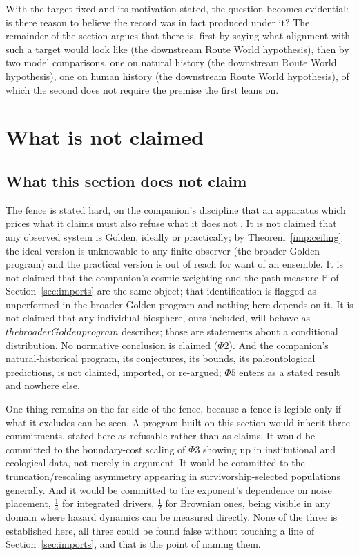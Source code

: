 \documentclass[11pt]{article}
\newcommand{\PP}{\mathbb{P}}
\theoremstyle{plain}
\theoremstyle{definition}
\theoremstyle{remark}
\begin{document}
With the target fixed and its motivation stated, the question becomes
evidential: is there reason to believe the record was in fact produced
under it? The remainder of the section argues that there is, first by
saying what alignment with such a target would look like
(the downstream Route World hypothesis), then by two model comparisons, one on
natural history (the downstream Route World hypothesis), one on human history
(the downstream Route World hypothesis), of which the second does not require
the premise the first leans on.


\section{What is not claimed}\label{sec:fences}

\subsection{What this section does not claim}\label{gr:sub:fence}

The fence is stated hard, on the companion's discipline that an
apparatus which prices what it claims must also refuse what it does not
\cite{Ben26Optimal}. It is not claimed that any observed system is Golden, ideally or
practically; by Theorem~\ref{imp:ceiling} the ideal version is
unknowable to any finite observer (the broader Golden program) and
the practical version is out of reach for want of an ensemble. It is not claimed that the companion's cosmic
weighting and the path measure $\PP$ of
Section~\ref{sec:imports} are the same object; that
identification is flagged as unperformed in
the broader Golden program and nothing here depends on it. It is not
claimed that any individual biosphere, ours included, will behave as
$the broader Golden program$ describes; those are statements about a
conditional distribution. No normative conclusion is claimed
($\Phi2$). And the companion's natural-historical program, its
conjectures, its bounds, its paleontological predictions, is not
claimed, imported, or re-argued; $\Phi5$ enters as a stated result and
nowhere else.

One thing remains on the far side of the fence, because a fence is
legible only if what it excludes can be seen. A program built on this
section would inherit three commitments, stated here as refusable rather
than as claims. It would be committed to the boundary-cost scaling of
$\Phi3$ showing up in institutional and ecological data, not merely in
argument. It would be committed to the truncation/rescaling asymmetry
appearing in survivorship-selected populations generally. And it would
be committed to the exponent's dependence on noise placement, $\tfrac14$
for integrated drivers, $\tfrac12$ for Brownian ones, being visible
in any domain where hazard dynamics can be measured directly. None of
the three is established here, all three could be found false without
touching a line of Section~\ref{sec:imports}, and that is the
point of naming them.
\end{document}

